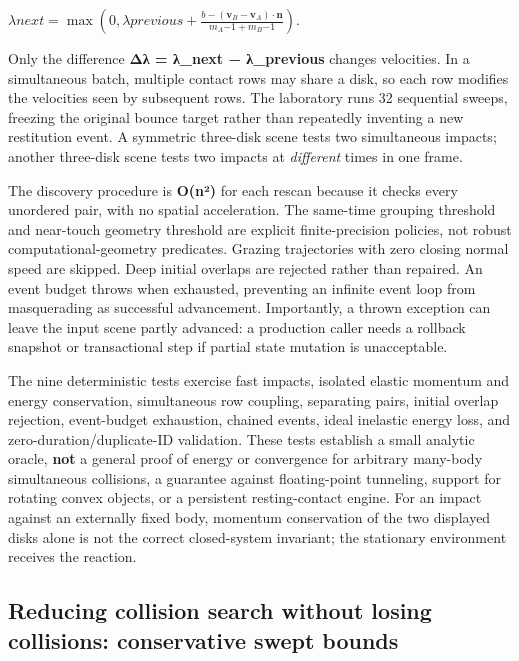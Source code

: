 \(\lambda{next}=\max\left(0,\lambda{previous} +\frac{b-(\mathbf v_B-\mathbf v_A)\cdot\mathbf n} {m_A{-1}+m_B{-1}}\right).\)

Only the difference \textbf{Δλ = λ\_next − λ\_previous} changes velocities. In a simultaneous batch, multiple contact rows may share a disk, so each row modifies the velocities seen by subsequent rows. The laboratory runs 32 sequential sweeps, freezing the original bounce target rather than repeatedly inventing a new restitution event. A symmetric three-disk scene tests two simultaneous impacts; another three-disk scene tests two impacts at \emph{different} times in one frame.

The discovery procedure is \textbf{O(n²)} for each rescan because it checks every unordered pair, with no spatial acceleration. The same-time grouping threshold and near-touch geometry threshold are explicit finite-precision policies, not robust computational-geometry predicates. Grazing trajectories with zero closing normal speed are skipped. Deep initial overlaps are rejected rather than repaired. An event budget throws when exhausted, preventing an infinite event loop from masquerading as successful advancement. Importantly, a thrown exception can leave the input scene partly advanced: a production caller needs a rollback snapshot or transactional step if partial state mutation is unacceptable.

The nine deterministic tests exercise fast impacts, isolated elastic momentum and energy conservation, simultaneous row coupling, separating pairs, initial overlap rejection, event-budget exhaustion, chained events, ideal inelastic energy loss, and zero-duration/duplicate-ID validation. These tests establish a small analytic oracle, \textbf{not} a general proof of energy or convergence for arbitrary many-body simultaneous collisions, a guarantee against floating-point tunneling, support for rotating convex objects, or a persistent resting-contact engine. For an impact against an externally fixed body, momentum conservation of the two displayed disks alone is not the correct closed-system invariant; the stationary environment receives the reaction.

\subsection{Reducing collision search without losing collisions: conservative swept bounds}\label{appendix-c9d92e145503-reducing-collision-search-without-losing-collisions-conservative-swept-bounds}

